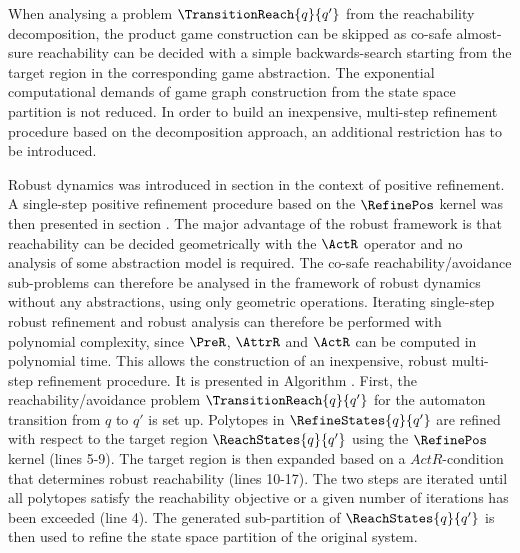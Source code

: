 \startsubsection[title={Robust Reachability Refinement},reference=sec:refinement-transition-reachability]


    When analysing a problem $\TransitionReach{q}{q'}$ from the reachability decomposition, the product game construction can be skipped as co-safe almost-sure reachability can be decided with a simple backwards-search starting from the target region in the corresponding game abstraction. %
    The exponential computational demands of game graph construction from the state space partition is not reduced.
    In order to build an inexpensive, multi-step refinement procedure based on the decomposition approach, an additional restriction has to be introduced.

    Robust dynamics was introduced in section  in the context of positive refinement.
    A single-step positive refinement procedure based on the $\RefinePos$ kernel was then presented in section .
    The major advantage of the robust framework is that reachability can be decided geometrically with the $\ActR$ operator and no analysis of some abstraction model is required.
    The co-safe reachability/avoidance sub-problems can therefore be analysed in the framework of robust dynamics without any abstractions, using only geometric operations.
    Iterating single-step robust refinement and robust analysis can therefore be performed with polynomial complexity, since $\PreR$, $\AttrR$ and $\ActR$ can be computed in polynomial time.
    This allows the construction of an inexpensive, robust multi-step refinement procedure.
    It is presented in Algorithm .
    First, the reachability/avoidance problem $\TransitionReach{q}{q'}$ for the automaton transition from $q$ to $q'$ is set up.
    Polytopes in $\RefineStates{q}{q'}$ are refined with respect to the target region $\ReachStates{q}{q'}$ using the $\RefinePos$ kernel (lines 5-9).
    The target region is then expanded based on a $ActR$-condition that determines robust reachability (lines 10-17).
    The two steps are iterated until all polytopes satisfy the reachability objective or a given number of iterations has been exceeded (line 4).
    The generated sub-partition of $\ReachStates{q}{q'}$ is then used to refine the state space partition of the original system.

